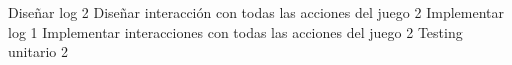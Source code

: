 \begin{taskstable}
 \task
 {Diseñar log}
 {2}
 \task
 {Diseñar interacción con todas las acciones del juego}
 {2}
 \task
 {Implementar log}
 {1}
 \task
 {Implementar interacciones con todas las acciones del juego}
 {2}
 \task
 {Testing unitario}
 {2}
\end{taskstable}






